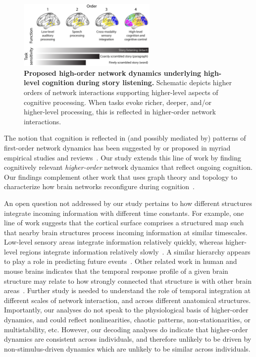 \documentclass[english]{article}
\begin{document}
\begin{figure}[tp]
  \centering
  \includegraphics[width=0.6\textwidth]{figs/discussion}
  \caption{\textbf{Proposed high-order network dynamics underlying
      high-level cognition during story listening.}  Schematic depicts
    higher orders of
    network interactions supporting higher-level aspects of cognitive
    processing.  When tasks evoke richer, deeper, and/or higher-level
    processing, this is reflected in higher-order network
    interactions.}
  \label{fig:discussion}
\end{figure}

The notion that cognition is reflected in (and possibly mediated by)
patterns of first-order network dynamics has been suggested by or
proposed in myriad empirical studies and
reviews~\citep[e.g.,][]{DemeEtal19, Turk13, LuriEtal18, FongEtal19,
  ParkEtal18b, PretEtal17, MannEtal18, RoyEtal19, LiegEtal19, ZouEtal19,
  ChanGlov10, GonzEtal19}.  Our study extends this line of work by
finding cognitively relevant \textit{higher-order} network dynamics
that reflect ongoing cognition.  Our findings complement other work
that uses graph theory and topology to characterize how brain networks
reconfigure during cognition~\citep[e.g.,][]{BassEtal06, ZhenEtal19,
  McInJirs19, TokeSomm19, SizeEtal18, ReimEtal17, BetzEtal19}.

An open question not addressed by our study pertains to how different
structures integrate incoming information with different time
constants.  For example, one line of work suggests that the cortical
surface comprises a structured map such that nearby brain structures
process incoming information at similar timescales.  Low-level sensory
areas integrate information relatively quickly, whereas higher-level
regions integrate information relatively slowly~\citep{BaldEtal17,
  HassEtal08, HassEtal15, HoneEtal12a, LernEtal11, LernEtal14,
  ChieHone19}.  A similar hierarchy appears to play a role in
predicting future events~\citep{LeeEtal20}.  Other
related work in human and mouse brains indicates that the temporal
response profile of a given brain structure may relate to how strongly
connected that structure is with other brain
areas~\citep{FallEtal19}.  Further study is needed to understand the
role of temporal integration at different scales of network
interaction, and across different anatomical structures. Importantly,
our analyses do not speak to the physiological basis of higher-order
dynamics, and could reflect nonlinearities, chaotic patterns,
non-stationarities, or multistability, etc. However, our decoding analyses do indicate
that higher-order dynamics are
consistent across individuals, and therefore unlikely to be driven by
non-stimulus-driven dynamics which are unlikely to be similar across
individuals.
\end{document}
